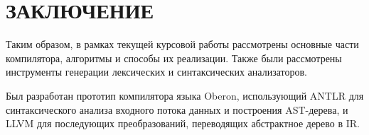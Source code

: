 \part*{ЗАКЛЮЧЕНИЕ}
Таким образом, в рамках текущей курсовой работы рассмотрены основные части компилятора, алгоритмы и способы их реализации. Также были рассмотрены инструменты генерации лексических и синтаксических анализаторов.

Был разработан прототип компилятора языка Oberon, использующий ANTLR для синтаксического анализа входного потока данных и построения AST-дерева, и LLVM для последующих преобразований, переводящих абстрактное дерево в IR.